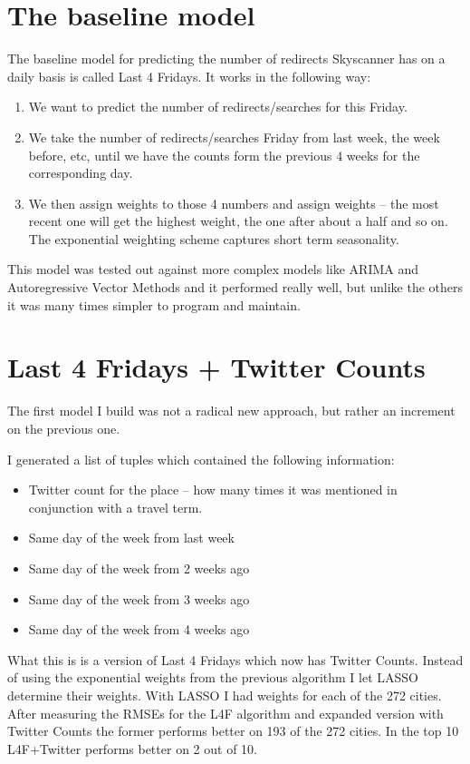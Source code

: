 \documentclass[minf,frontabs,twoside,singlespacing,parskip]{infthesis}
\begin{document}
\section{The baseline model}
\label{sec:baseline}

The baseline model for predicting the number of redirects Skyscanner has on a daily basis is called Last 4 Fridays. 
It works in the following way:
\begin{enumerate}
\item We want to predict the number of redirects/searches for this Friday.
\item We take the number of redirects/searches Friday from last week, the week before, etc, until we have the counts form the previous 4 weeks for the corresponding day.
\item We then assign weights to those 4 numbers and assign weights -- the most recent one will get the highest weight, the one after about a half and so on. The exponential weighting scheme captures short term seasonality.
\end{enumerate}

This model was tested out against more complex models like ARIMA and Autoregressive Vector Methods and it performed really well, but unlike the others it was many times simpler to program and maintain.

\section{Last 4 Fridays + Twitter Counts}

The first model I build was not a radical new approach, but rather an increment on the previous one.

I generated a list of tuples which contained the following information:
\begin{itemize}
\item Twitter count for the place -- how many times it was mentioned in conjunction with a travel term.
\item Same day of the week from last week
\item Same day of the week from 2 weeks ago
\item Same day of the week from 3 weeks ago
\item Same day of the week from 4 weeks ago
\end{itemize}

What this is is a version of Last 4 Fridays which now has Twitter Counts. Instead of using the exponential weights from the previous algorithm I let LASSO determine their weights.
With LASSO I had weights for each of the 272 cities. After measuring the RMSEs for the L4F algorithm and expanded version with Twitter Counts the former performs better on 193 of the 272 cities. In the top 10 L4F+Twitter performs better on 2 out of 10. 
\end{document}
